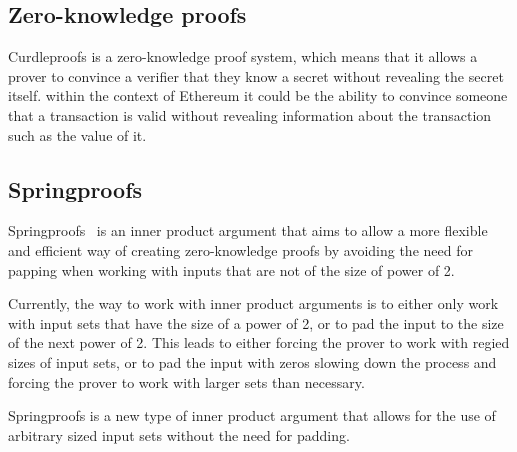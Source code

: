 \subsection{Zero-knowledge proofs}\label{sec:background-zkps}
Curdleproofs is a zero-knowledge proof system, which means that it allows a prover to convince a verifier that they know a secret without revealing the secret itself.
within the context of Ethereum it could be the ability to convince someone that a transaction is valid without revealing information about the transaction such as the value of it.



\subsection{Springproofs}\label{sec:background-springproofs}
Springproofs~\cite{zhang2024springproofs} is an inner product argument that aims to allow a more flexible and efficient way of creating zero-knowledge proofs by avoiding the need for papping when working with inputs that are not of the size of power of 2.

Currently, the way to work with inner product arguments is to either only work with input sets that have the size of a power of 2, or to pad the input to the size of the next power of 2.
This leads to either forcing the prover to work with regied sizes of input sets, or to pad the input with zeros slowing down the process and forcing the prover to work with larger sets than necessary.

Springproofs is a new type of inner product argument that allows for the use of arbitrary sized input sets without the need for padding.


